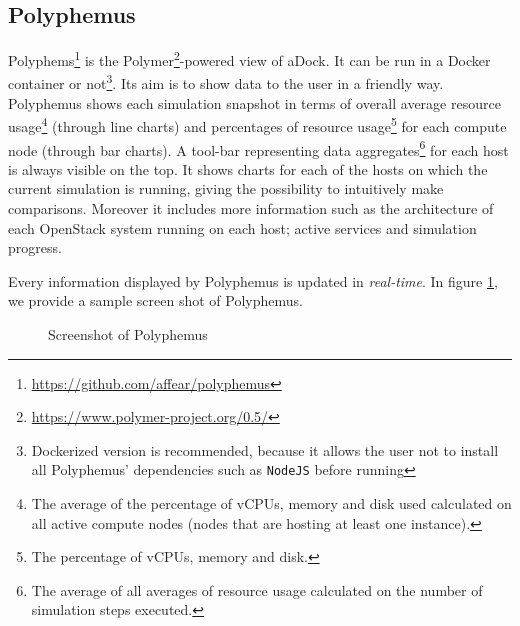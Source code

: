 \subsection{Polyphemus}
\label{sub:polyphemus}
Polyphems\footnote{\url{https://github.com/affear/polyphemus}} is the Polymer\footnote{\url{https://www.polymer-project.org/0.5/}}-powered view of aDock. It can be run in a Docker container or not\footnote{Dockerized version is recommended, because it allows the user not to install all Polyphemus' dependencies such as \texttt{NodeJS} before running}. Its aim is to show data to the user in a friendly way. Polyphemus shows each simulation snapshot in terms of overall average resource usage\footnote{The average of the percentage of vCPUs, memory and disk used calculated on all active compute nodes (nodes that are hosting at least one instance).} (through line charts) and percentages of resource usage\footnote{The percentage of vCPUs, memory and disk.} for each compute node (through bar charts). A tool-bar representing data aggregates\footnote{The average of all averages of resource usage calculated on the number of simulation steps executed.} for each host is always visible on the top. It shows charts for each of the hosts on which the current simulation is running, giving the possibility to intuitively make comparisons. Moreover it includes more information such as the architecture of each OpenStack system running on each host; active services and simulation progress.

Every information displayed by Polyphemus is updated in \textit{real-time}. In figure \ref{fig:poly}, we provide a sample screen shot of Polyphemus. 

\begin{figure}[H]
\label{fig:poly}
\caption{Screenshot of Polyphemus}
\end{figure}

